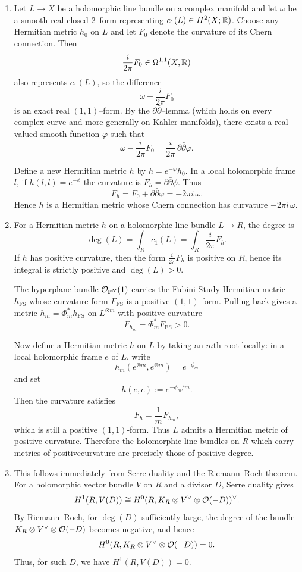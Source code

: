 \documentclass[12pt]{article}
\begin{document}
\begin{solution}
    \leavevmode
  \begin{enumerate}
    \item 
 Let $L\to X$ be a holomorphic line bundle on a complex manifold and let
$\omega$ be a smooth real closed $2$--form representing $c_1(L)\in H^2(X;\mathbb{R})$.
Choose any Hermitian metric $h_0$ on $L$ and let $F_0$ denote the curvature of
its Chern connection.  Then
\[
\frac{i}{2\pi}F_0\in\Omega^{1,1}(X,\mathbb{R})
\] also represents $c_1(L)$, so the difference
\[
\omega-\frac{i}{2\pi}F_0
\]
is an exact real $(1,1)$--form.  By the $\partial\bar\partial$--lemma (which
holds on every complex curve and more generally on K\"ahler manifolds), there
exists a real-valued smooth function $\varphi$ such that
\[
\omega-\frac{i}{2\pi}F_0=\frac{i}{2\pi}\,\partial\bar\partial\varphi.
\]

Define a new Hermitian metric $h$ by $h=e^{-\varphi}h_0$. In a local holomorphic frame $l$, if $h(l,l)=e^{-\phi}$
the curvature is $F_h=\partial\bar\partial\phi$.
Thus
\[
F_h = F_0 + \partial\bar\partial\varphi
     = -2\pi i\,\omega.
\]
Hence $h$ is a Hermitian metric whose Chern connection has curvature $-2\pi i\,\omega$.

\item
For a Hermitian metric $h$ on a holomorphic line bundle $L\to R$, the degree is
\[
\deg(L)=\int_R c_1(L)
       = \int_R \frac{i}{2\pi}F_h.
\]
If $h$ has positive curvature, then the form $\frac{i}{2\pi}F_h$ is positive on
$R$, hence its integral is strictly positive and $\deg(L)>0$.

The hyperplane bundle ${\mathcal{O}}_{\mathbb{P}^N}(1)$ carries the Fubini-Study Hermitian
metric $h_{\mathrm{FS}}$ whose curvature form $F_{\mathrm{FS}}$ is a
positive $(1,1)$-form.  Pulling back gives a metric $h_m = \Phi_m^*
h_{\mathrm{FS}}$ on $L^{\otimes m}$ with positive curvature
\[
F_{h_m} = \Phi_m^* F_{\mathrm{FS}} > 0.
\]

Now define a Hermitian metric $h$ on $L$ by taking an $m$th root locally:
in a local holomorphic frame $e$ of $L$, write
\[
h_m(e^{\otimes m}, e^{\otimes m}) = e^{-\phi_m}
\]
and set
\[
h(e,e) := e^{-\phi_m/m}.
\]
Then the curvature satisfies
\[
F_h = \frac{1}{m} F_{h_m},
\]
which is still a positive $(1,1)$-form.  Thus $L$ admits a Hermitian metric
of positive curvature. Therefore the holomorphic line bundles on $R$ which carry metrics of positivecurvature are precisely those of positive degree.

\item This follows immediately from Serre duality and the Riemann--Roch theorem.  For a holomorphic vector bundle $V$ on $R$ and a divisor $D$, Serre duality gives
\[H^1(R,V(D)) \cong H^0(R, K_R \otimes V^\vee \otimes {\mathcal{O}}(-D))^\vee.\]
By Riemann--Roch, for $\deg(D)$ sufficiently large, the degree of the bundle $K_R \otimes V^\vee \otimes {\mathcal{O}}(-D)$ becomes negative, and hence
\[H^0(R, K_R \otimes V^\vee \otimes {\mathcal{O}}(-D)) = 0.\]
Thus, for such $D$, we have $H^1(R,V(D))=0$.  
\end{enumerate}
\end{solution}
\end{document}
